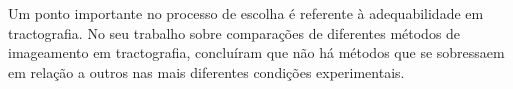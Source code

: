 \documentclass[
    12pt,                %
    oneside,            %
    a4paper,            %
    english,            %
    french,                %
    spanish,            %
    brazil                %
    ]{abntex2}
\begin{document}
Um ponto importante no processo de escolha é referente à adequabilidade em tractografia. No seu trabalho sobre comparações de diferentes métodos de imageamento em tractografia,  concluíram que não há métodos que se sobressaem em relação a outros nas mais diferentes condições experimentais.


























\end{document}
